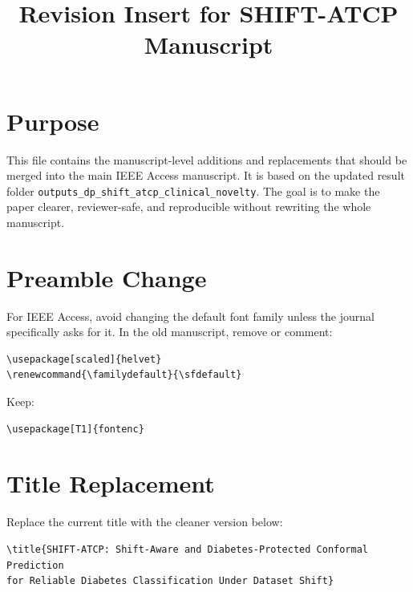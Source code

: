 \documentclass[11pt]{article}
\title{Revision Insert for SHIFT-ATCP Manuscript}
\author{}
\date{}
\begin{document}
\maketitle

\section*{Purpose}
This file contains the manuscript-level additions and replacements that should be merged into the main IEEE Access manuscript. It is based on the updated result folder \texttt{outputs\_dp\_shift\_atcp\_clinical\_novelty}. The goal is to make the paper clearer, reviewer-safe, and reproducible without rewriting the whole manuscript.

\section{Preamble Change}
For IEEE Access, avoid changing the default font family unless the journal specifically asks for it. In the old manuscript, remove or comment:
\begin{verbatim}
\usepackage[scaled]{helvet}
\renewcommand{\familydefault}{\sfdefault}
\end{verbatim}
Keep:
\begin{verbatim}
\usepackage[T1]{fontenc}
\end{verbatim}

\section{Title Replacement}
Replace the current title with the cleaner version below:
\begin{verbatim}
\title{SHIFT-ATCP: Shift-Aware and Diabetes-Protected Conformal Prediction
for Reliable Diabetes Classification Under Dataset Shift}
\end{verbatim}
\end{document}
